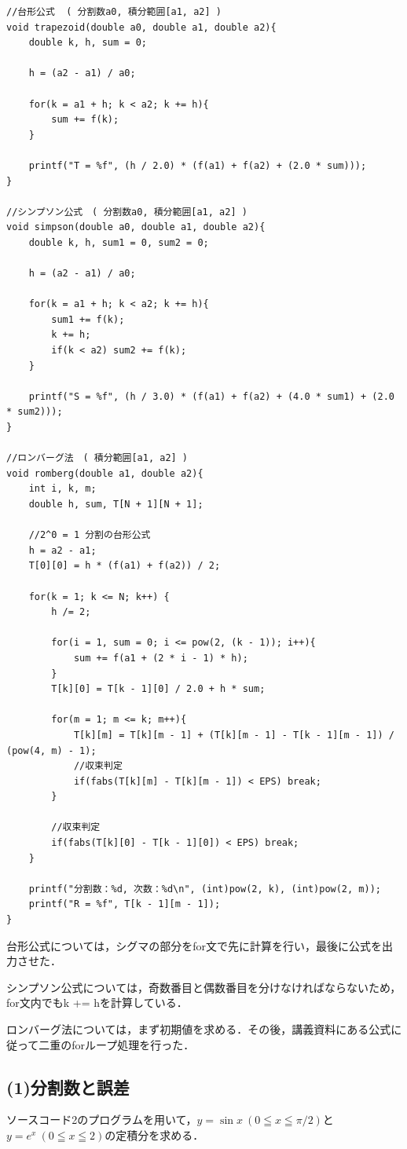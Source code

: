 \documentclass[titlepage,dvipdfmx]{jsarticle}
\begin{document}
\begin{lstlisting}[caption=exp\_app, label=src:exp]
//台形公式  ( 分割数a0, 積分範囲[a1, a2] )
void trapezoid(double a0, double a1, double a2){
	double k, h, sum = 0;

	h = (a2 - a1) / a0;

	for(k = a1 + h; k < a2; k += h){
		sum += f(k);
	}

	printf("T = %f", (h / 2.0) * (f(a1) + f(a2) + (2.0 * sum)));
}

//シンプソン公式　( 分割数a0, 積分範囲[a1, a2] )
void simpson(double a0, double a1, double a2){
	double k, h, sum1 = 0, sum2 = 0;

	h = (a2 - a1) / a0;

	for(k = a1 + h; k < a2; k += h){
		sum1 += f(k);
		k += h;
		if(k < a2) sum2 += f(k);
	}

	printf("S = %f", (h / 3.0) * (f(a1) + f(a2) + (4.0 * sum1) + (2.0 * sum2)));
}

//ロンバーグ法　( 積分範囲[a1, a2] )
void romberg(double a1, double a2){
	int i, k, m;
	double h, sum, T[N + 1][N + 1];

	//2^0 = 1 分割の台形公式
	h = a2 - a1;
	T[0][0] = h * (f(a1) + f(a2)) / 2;
	
	for(k = 1; k <= N; k++) {
		h /= 2;

		for(i = 1, sum = 0; i <= pow(2, (k - 1)); i++){
			sum += f(a1 + (2 * i - 1) * h);
		}
		T[k][0] = T[k - 1][0] / 2.0 + h * sum;

		for(m = 1; m <= k; m++){
			T[k][m] = T[k][m - 1] + (T[k][m - 1] - T[k - 1][m - 1]) / (pow(4, m) - 1);
			//収束判定
			if(fabs(T[k][m] - T[k][m - 1]) < EPS) break;
		}

		//収束判定
		if(fabs(T[k][0] - T[k - 1][0]) < EPS) break;
	}

	printf("分割数：%d, 次数：%d\n", (int)pow(2, k), (int)pow(2, m));
	printf("R = %f", T[k - 1][m - 1]);
}
\end{lstlisting}

台形公式については，シグマの部分をfor文で先に計算を行い，最後に公式を出力させた．

シンプソン公式については，奇数番目と偶数番目を分けなければならないため，for文内でもk += hを計算している．

ロンバーグ法については，まず初期値を求める．その後，講義資料にある公式に従って二重のforループ処理を行った．

\subsection*{(1)分割数と誤差}
ソースコード2のプログラムを用いて，$y = \sin x\:(0 \leqq x \leqq \pi / 2)$と$y = e^x\:(0 \leqq x \leqq 2)$の定積分を求める．
\end{document}
